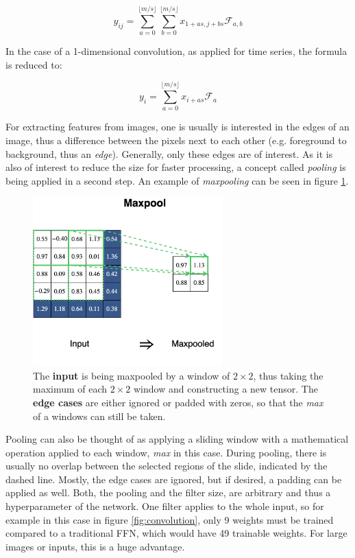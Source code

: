 \documentclass[11pt]{scrartcl}
\begin{document}
\begin{equation}
	y_{ij} = \sum_{a=0}^{\lfloor m/s \rfloor} \sum_{b=0}^{\lfloor m/s \rfloor} x_{1+as, j+bs} \mathcal{F}_{a,b}
\end{equation}

In the case of a 1-dimensional convolution, as applied for time series, the formula is reduced to:

\begin{equation}
	y_{i} = \sum_{a=0}^{\lfloor m/s \rfloor} x_{i+as} \mathcal{F}_{a}
\end{equation}

For extracting features from images, one is usually is interested in the edges of an image, thus a difference between the pixels next to each other (e.g. foreground to background, thus an \textit{edge}). Generally, only these edges are of interest. As it is also of interest to reduce the size for faster processing, a concept called \textit{pooling} is being applied in a second step. An example of \textit{maxpooling} can be seen in figure \ref{fig:maxpool}.

\begin{figure}[hbt]
	\center
	\includegraphics[width=0.65\textwidth]{img/general/maxpool.png}
	\caption{The \textcolor{viridis7}{\textbf{input}} is being maxpooled by a window of $2\times2$, thus taking the maximum of each $2\times2$ window and constructing a new tensor. The \textcolor{viridis2}{\textbf{edge cases}} are either ignored or padded with zeros, so that the \textit{max} of a windows can still be taken.}
	\label{fig:maxpool}
\end{figure}

Pooling can also be thought of as applying a sliding window with a mathematical operation applied to each window, \textit{max} in this case. During pooling, there is usually no overlap between the selected regions of the slide, indicated by the dashed line. Mostly, the edge cases are ignored, but if desired, a padding can be applied as well. Both, the pooling and the filter size, are arbitrary and thus a hyperparameter of the network. One filter applies to the whole input, so for example in this case in figure \ref{fig:convolution}, only 9 weights must be trained compared to a traditional FFN, which would have 49 trainable weights. For large images or inputs, this is a huge advantage.
\end{document}
